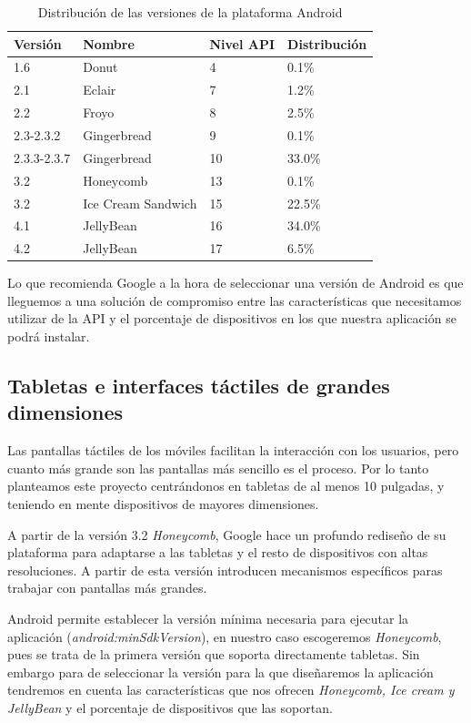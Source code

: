 \begin{table}
\begin{center}

  
  \begin{tabular}{ |l|l|l|l| }
    \hline
    \rowcolor{RubineRed} {\color{White} Versión} & {\color{White} Nombre }& {\color{White} Nivel API }& {\color{White} Distribución} \\ \hline
    1.6 & Donut & 4 & 0.1\%  \\ \hline
    2.1 & Eclair & 7 & 1.2\%  \\ \hline
    2.2 & Froyo & 8 & 2.5\%  \\ \hline
    2.3-2.3.2 & Gingerbread & 9 & 0.1\%  \\ \hline
    2.3.3-2.3.7 & Gingerbread & 10 & 33.0\%  \\ \hline
    3.2 & Honeycomb & 13 & 0.1\%  \\ \hline
    3.2 & Ice Cream Sandwich & 15 & 22.5\%  \\ \hline
    4.1 & JellyBean & 16 & 34.0\%  \\ \hline
    4.2 & JellyBean & 17 & 6.5\%  \\ \hline
    
    \end{tabular}
\end{center}
\caption{Distribución de las versiones de la plataforma Android}
  \label{android:distro}
\end{table}

Lo que recomienda Google a la hora de seleccionar una versión de Android es que lleguemos a una solución de compromiso entre las características que necesitamos utilizar de la API y el porcentaje de dispositivos en los que nuestra aplicación se podrá instalar.\par

\subsection{Tabletas e interfaces táctiles de grandes dimensiones}
Las pantallas táctiles de los móviles facilitan la interacción con los usuarios, pero cuanto más grande son las pantallas más sencillo es el proceso. Por lo tanto planteamos este proyecto centrándonos en tabletas de al menos 10 pulgadas, y teniendo en mente dispositivos de mayores dimensiones.\medskip\par
A partir de la versión 3.2 \emph{Honeycomb}, Google hace un profundo rediseño de su plataforma para adaptarse a las tabletas y el resto de dispositivos con altas resoluciones. A partir de esta versión introducen mecanismos específicos paras trabajar con pantallas más grandes.\par
Android permite establecer la versión mínima necesaria para ejecutar la aplicación (\emph{android:minSdkVersion}), en nuestro caso escogeremos \emph{Honeycomb}, pues se trata de la primera versión que soporta directamente tabletas. Sin embargo para de seleccionar la versión para la que diseñaremos la aplicación tendremos en cuenta las características que nos ofrecen \emph{Honeycomb, Ice cream y JellyBean} y el porcentaje de dispositivos que las soportan.\par

